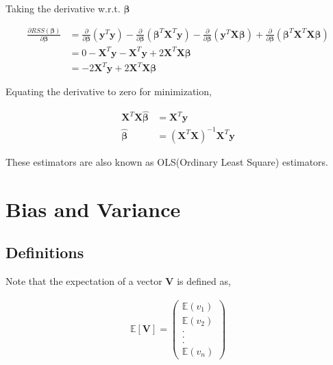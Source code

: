 \documentclass[11pt, a4paper]{article}
\begin{document}
Taking the derivative w.r.t. $\boldsymbol{\beta}$

\begin{align*}
	\frac{\partial RSS(\boldsymbol{\beta})}{\partial \boldsymbol{\beta}} & =                                                                                                 
	\frac{\partial}{\partial \boldsymbol{\beta}}(\mathbf{y}^T\mathbf{y}) - \frac{\partial}{\partial \boldsymbol{\beta}}(\boldsymbol{\beta}^T\mathbf{X}^T\mathbf{y}) - \frac{\partial}{\partial \boldsymbol{\beta}}(\mathbf{y}^T\mathbf{X}\boldsymbol{\beta}) + \frac{\partial}{\partial \boldsymbol{\beta}}(\boldsymbol{\beta}^T\mathbf{X}^T\mathbf{X}\boldsymbol{\beta}) \\
	                                                                     & = 0 - \mathbf{X}^T\mathbf{y} - \mathbf{X}^T\mathbf{y} + 2\mathbf{X}^T\mathbf{X}\boldsymbol{\beta} \\
	                                                                     & = -2\mathbf{X}^T\mathbf{y} + 2\mathbf{X}^T\mathbf{X}\boldsymbol{\beta}                            
\end{align*}

Equating the derivative to zero for minimization,

\begin{align*}
	\mathbf{X}^T\mathbf{X}\boldsymbol{\hat{\beta}} & = \mathbf{X}^T\mathbf{y}                              \\
	\boldsymbol{\hat{\beta}}                       & = (\mathbf{X}^T\mathbf{X})^{-1}\mathbf{X}^T\mathbf{y} 
\end{align*}

These estimators are also known as OLS(Ordinary Least Square) estimators.

\section{Bias and Variance}
\subsection{Definitions}
Note that the expectation of a vector $\mathbf{V}$ is defined as,

\begin{align*}
	\mathbb{E}[\mathbf{V}] = \begin{pmatrix} \mathbb{E}(v_1) \\ \mathbb{E}(v_2) \\ . \\ . \\ .  \\ \mathbb{E}(v_n) \end{pmatrix}
\end{align*}
\end{document}
